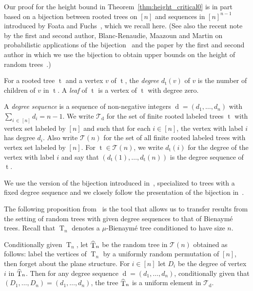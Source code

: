 \documentclass[10pt]{amsart}
\theoremstyle{definition}\newtheorem{defi}[theo]{Definition}\newtheorem{rema}[theo]{Remark}\newtheorem{exam}[theo]{Example}\newtheorem{exem}[theo]{Example}\newtheorem{nota}[theo]{Notation}
\DeclareMathOperator{\tree}{t}
\DeclareMathOperator{\rtree}{T}
\DeclareMathOperator{\dseq}{d}
\newcommand\cT{\mathcal{T}}
\let\oldhat\hat
\renewcommand*{\hat}[1]{\mathchoice{\widehat{#1}}{\widehat{#1}}{\oldhat{#1}}{\oldhat{#1}}}
\begin{document}
Our {proof for the height bound in Theorem~\ref{thm:height_critical0}} is in part based on a bijection between rooted trees on $[n]$ and sequences in $[n]^{n-1}$ introduced by Foata and Fuchs~\cite{FoataFuchs}, which we recall here. (See also the recent note by the first and second author, Blanc-Renaudie, Maazoun and Martin on probabilistic applications of the bijection~\cite{cayley_us} and the paper by the first and second author in which we use the bijection to obtain upper bounds on the height of random trees~\cite{AD22}.)

For a rooted tree $\tree$ and a vertex $v$ of $\tree$, the \emph{degree} $d_{\tree}(v)$ of $v$ is the number of children of $v$ in $\tree$. A \emph{leaf} of $\tree$ is a vertex of $\tree$ with degree zero.

A \emph{degree sequence} is a sequence of non-negative integers $\dseq=(d_1,\ldots,d_n)$ with $\sum_{i\,\in \,[n]} d_i = n-1$. We write $\cT_{\dseq}$ for the set of finite rooted labeled trees $\tree$ with vertex set labeled by $[n]$ and such that for each $i \in [n]$, the vertex with label $i$ has degree $d_i$. Also write $\cT(n)$ for the set of all finite rooted labeled trees with vertex set labeled by $[n]$. For $\tree \in \cT(n)$, we write $d_{\tree}(i)$ for the degree of the vertex with label $i$ and say that $(d_{\tree}(1),\ldots,d_{\tree}(n))$ is the degree sequence of $\tree$.

We use the version of the bijection introduced in~\cite[Section~3]{cayley_us}, specialized to trees with a fixed degree sequence and we closely follow the presentation of the bijection in~\cite{AD22}.


The following proposition from~\cite{AD22} is the tool that allows us to transfer results from the setting of random trees with given degree sequences to that of Bienaymé trees. Recall that $\rtree_n$ denotes a $\mu$-Bienaymé tree conditioned to have size $n$.

\begin{prop}[{\cite[Proposition~8]{AD22}}]\label{prop:planetrees}
Conditionally given $\rtree_{n}$, let $\hat{\rtree}_{n}$ be the random tree in $\cT(n)$ obtained as follows: label the vertices of $\rtree_{n}$ by a uniformly random permutation of $[n]$, then forget about the plane structure. For $i \in [n]$ let $D_i$ be the degree of vertex $i$ in $\hat{\rtree}_{n}$. Then for any degree sequence $\dseq=(d_1,\ldots,d_n)$, conditionally given that $(D_1,\ldots,D_n)=(d_1,\ldots,d_n)$, the tree $\hat{\rtree}_{n}$ is a uniform element in $\cT_{\dseq}$.
\end{prop}
\end{document}
